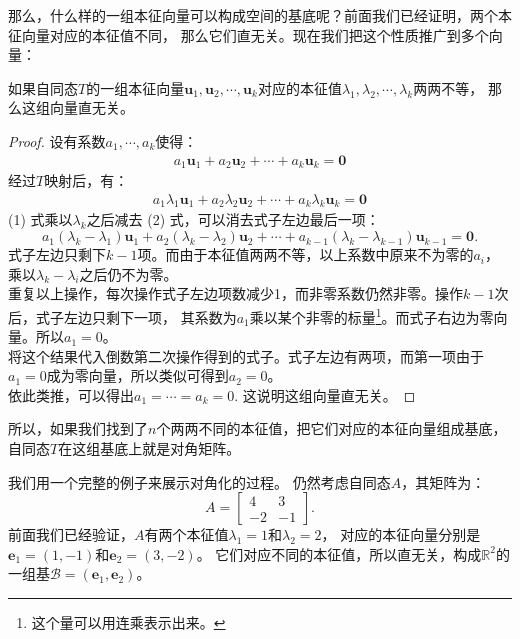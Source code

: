 \documentclass[12pt,UTF8,fontset=none]{ctexbook}
\begin{document}
那么，什么样的一组本征向量可以构成空间的基底呢？前面我们已经证明，两个本征向量对应的本征值不同，
那么它们直无关。现在我们把这个性质推广到多个向量：
\begin{pp}\label{pp:6_2}
    如果自同态$T$的一组本征向量$\mathbf{u}_1, \mathbf{u}_2, \cdots, \mathbf{u}_k$对应的本征值$\lambda_1, \lambda_2, \cdots, \lambda_k$两两不等，
    那么这组向量直无关。
\end{pp}
\begin{proof} %
    设有系数$a_1, \cdots, a_k$使得：
    \begin{align*}
         a_1 \mathbf{u}_1 + a_2 \mathbf{u}_2 + \cdots + a_k \mathbf{u}_k = \mathbf{0}\tag{1}
    \end{align*}
    经过$T$映射后，有：
    \begin{align*} 
        a_1 \lambda_1\mathbf{u}_1 + a_2 \lambda_2 \mathbf{u}_2 + \cdots + a_k \lambda_k \mathbf{u}_k = \mathbf{0}\tag{2}
    \end{align*}
    (1) 式乘以$\lambda_k$之后减去 (2) 式，可以消去式子左边最后一项：
    $$ a_1 (\lambda_k - \lambda_1)\mathbf{u}_1 + a_2 (\lambda_k - \lambda_2) \mathbf{u}_2 + \cdots + a_{k-1} (\lambda_k - \lambda_{k-1}) \mathbf{u}_{k-1} = \mathbf{0}.$$
    式子左边只剩下$k-1$项。而由于本征值两两不等，以上系数中原来不为零的$a_i$，乘以$\lambda_k - \lambda_i$之后仍不为零。\\
    重复以上操作，每次操作式子左边项数减少1，而非零系数仍然非零。操作$k-1$次后，式子左边只剩下一项，
    其系数为$a_1$乘以某个非零的标量\footnote{这个量可以用连乘表示出来。}。而式子右边为零向量。所以$a_1 = 0$。\\
    将这个结果代入倒数第二次操作得到的式子。式子左边有两项，而第一项由于$a_1=0$成为零向量，所以类似可得到$a_2 = 0$。\\
    依此类推，可以得出$a_1 = \cdots = a_k = 0.$ 这说明这组向量直无关。 
    
\end{proof}

所以，如果我们找到了$n$个两两不同的本征值，把它们对应的本征向量组成基底，自同态$T$在这组基底上就是对角矩阵。

我们用一个完整的例子来展示对角化的过程。
仍然考虑自同态$A$，其矩阵为：
$$
A = \begin{bmatrix} 4 & 3 \\ -2 & -1 \end{bmatrix}.
$$
前面我们已经验证，$A$有两个本征值$\lambda_1 = 1$和$\lambda_2 = 2$，
对应的本征向量分别是$\mathbf{e}_1 = (1,-1)$和$\mathbf{e}_2 = (3,-2)$。
它们对应不同的本征值，所以直无关，构成$\mathbb{R}^2$的一组基$\mathcal{B} = (\mathbf{e}_1, \mathbf{e}_2)$。
\end{document}
